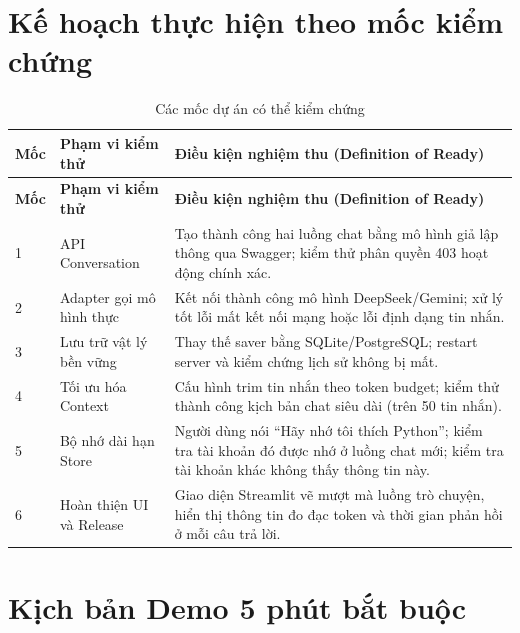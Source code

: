 \section{Kế hoạch thực hiện theo mốc kiểm chứng}

\begin{longtable}{p{1.2cm}p{5.2cm}p{8.2cm}}
\caption{Các mốc dự án có thể kiểm chứng}\label{tab:capstone-slices}\\
\toprule
\textbf{Mốc} & \textbf{Phạm vi kiểm thử} & \textbf{Điều kiện nghiệm thu (Definition of Ready)} \\
\midrule
\endfirsthead
\toprule
\textbf{Mốc} & \textbf{Phạm vi kiểm thử} & \textbf{Điều kiện nghiệm thu (Definition of Ready)} \\
\midrule
\endhead
1 & API Conversation & Tạo thành công hai luồng chat bằng mô hình giả lập thông qua Swagger; kiểm thử phân quyền 403 hoạt động chính xác. \\
2 & Adapter gọi mô hình thực & Kết nối thành công mô hình DeepSeek/Gemini; xử lý tốt lỗi mất kết nối mạng hoặc lỗi định dạng tin nhắn. \\
3 & Lưu trữ vật lý bền vững & Thay thế saver bằng SQLite/PostgreSQL; restart server và kiểm chứng lịch sử không bị mất. \\
4 & Tối ưu hóa Context & Cấu hình trim tin nhắn theo token budget; kiểm thử thành công kịch bản chat siêu dài (trên 50 tin nhắn). \\
5 & Bộ nhớ dài hạn Store & Người dùng nói ``Hãy nhớ tôi thích Python''; kiểm tra tài khoản đó được nhớ ở luồng chat mới; kiểm tra tài khoản khác không thấy thông tin này. \\
6 & Hoàn thiện UI và Release & Giao diện Streamlit vẽ mượt mà luồng trò chuyện, hiển thị thông tin đo đạc token và thời gian phản hồi ở mỗi câu trả lời. \\
\bottomrule
\end{longtable}

\section{Kịch bản Demo 5 phút bắt buộc}

